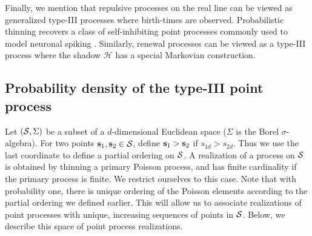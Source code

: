\documentclass{statsoc}
\begin{document}
Finally, we mention that repulsive processes on the real line can be viewed as generalized \matern type-III processes where birth-times are
observed. Probabilistic thinning recovers a class of self-inhibiting point processes commonly used to model neuronal spiking \citep{Brown2004a}. Similarly, renewal processes
can be viewed as a \matern type-III process where the shadow $\mathscr{H}$ has a special Markovian construction. %


\subsection{Probability density of the \matern type-III point process}  \label{sec:matern_pdf}

%
Let $({\mathcal S}, \Sigma)$ be a subset of a $d$-dimensional Euclidean space ($\Sigma$ is the Borel $\sigma$-algebra). For two points $\mathbf{s}_1, \mathbf{s}_2 \in {\mathcal S}$,
define ${\mathbf{s}_1 > \mathbf{s}_2}$ if ${s_{1d} > s_{2d}}$. Thus we use the last coordinate to define a partial ordering on ${\mathcal S}$.
A realization %
of a \matern process on ${\mathcal S}$  is obtained by thinning a primary Poisson process, and has finite cardinality if the primary process is finite. 
We restrict ourselves to this case. Note that with probability one, there is unique ordering of the Poisson elements
according to the partial ordering we defined earlier. This will allow us to associate realizations of point processes
with unique, increasing sequences of points in ${\mathcal S}$. Below, we describe this space of point process realizations.
\end{document}
